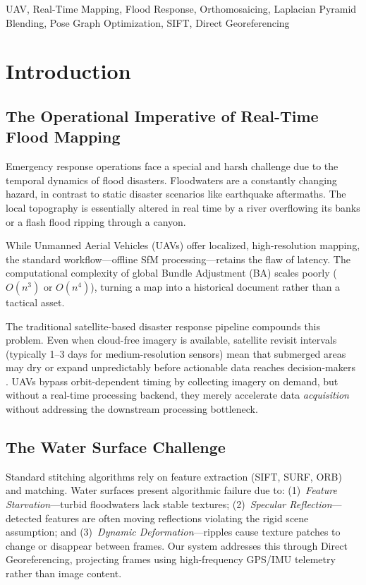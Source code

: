\documentclass[conference]{IEEEtran}
\begin{document}
\begin{IEEEkeywords}
UAV, Real-Time Mapping, Flood Response, Orthomosaicing, Laplacian Pyramid Blending, Pose Graph Optimization, SIFT, Direct Georeferencing
\end{IEEEkeywords}

\section{Introduction}

\subsection{The Operational Imperative of Real-Time Flood Mapping}

Emergency response operations face a special and harsh challenge due to the temporal dynamics of flood disasters. Floodwaters are a constantly changing hazard, in contrast to static disaster scenarios like earthquake aftermaths. The local topography is essentially altered in real time by a river overflowing its banks or a flash flood ripping through a canyon.

While Unmanned Aerial Vehicles (UAVs) offer localized, high-resolution mapping, the standard workflow---offline SfM processing---retains the flaw of latency. The computational complexity of global Bundle Adjustment (BA) scales poorly ($O(n^3)$ or $O(n^4)$), turning a map into a historical document rather than a tactical asset.

The traditional satellite-based disaster response pipeline compounds this problem. Even when cloud-free imagery is available, satellite revisit intervals (typically 1--3 days for medium-resolution sensors) mean that submerged areas may dry or expand unpredictably before actionable data reaches decision-makers \cite{flood_challenges}. UAVs bypass orbit-dependent timing by collecting imagery on demand, but without a real-time processing backend, they merely accelerate data \emph{acquisition} without addressing the downstream processing bottleneck.

\subsection{The Water Surface Challenge}

Standard stitching algorithms rely on feature extraction (SIFT, SURF, ORB) and matching. Water surfaces present algorithmic failure due to: (1)~\textit{Feature Starvation}---turbid floodwaters lack stable textures; (2)~\textit{Specular Reflection}---detected features are often moving reflections violating the rigid scene assumption; and (3)~\textit{Dynamic Deformation}---ripples cause texture patches to change or disappear between frames. Our system addresses this through Direct Georeferencing, projecting frames using high-frequency GPS/IMU telemetry rather than image content.
\end{document}
